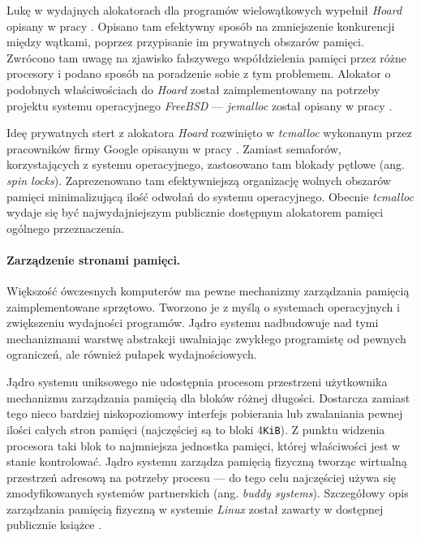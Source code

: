 \documentclass[12pt,a4paper,titlepage,twoside]{mwart}
\begin{document}
Lukę w wydajnych alokatorach dla programów wielowątkowych wypełnił
\textit{Hoard} opisany w pracy \cite{berger00hoard}. Opisano tam efektywny
sposób na zmniejszenie konkurencji między wątkami, poprzez przypisanie im
prywatnych obszarów pamięci. Zwrócono tam uwagę na zjawisko fałszywego
współdzielenia pamięci przez różne procesory i podano sposób na poradzenie
sobie z tym problemem. Alokator o podobnych właściwościach do \textit{Hoard}
został zaimplementowany na potrzeby projektu systemu operacyjnego
\textit{FreeBSD} --- \textit{jemalloc} został opisany w pracy
\cite{evans06scalable}.

Ideę prywatnych stert z alokatora \textit{Hoard} rozwinięto w
\textit{tcmalloc} wykonanym przez pracowników firmy Google opisanym w pracy
\cite{ghemawat07tcmalloc}. Zamiast semaforów, korzystających z systemu
operacyjnego, zastosowano tam blokady pętlowe (ang.  \textit{spin locks}).
Zaprezenowano tam efektywniejszą organizację wolnych obszarów pamięci
minimalizującą ilość odwołań do systemu operacyjnego.  Obecnie
\textit{tcmalloc} wydaje się być najwydajniejszym publicznie dostępnym
alokatorem pamięci ogólnego przeznaczenia.

\paragraph{Zarządzenie stronami pamięci.}

Większość ówczesnych komputerów ma pewne mechanizmy zarządzania pamięcią
zaimplementowane sprzętowo. Tworzono je z myślą o systemach operacyjnych i
zwiększeniu wydajności programów. Jądro systemu nadbudowuje nad tymi
mechanizmami warstwę abstrakcji uwalniając zwykłego programistę od pewnych
ograniczeń, ale również pułapek wydajnościowych.

Jądro systemu uniksowego nie udostępnia procesom przestrzeni użytkownika
mechanizmu zarządzania pamięcią dla bloków różnej długości. Dostarcza zamiast
tego nieco bardziej niskopoziomowy interfejs pobierania lub zwalaniania pewnej
ilości całych stron pamięci (najczęściej są to bloki 4\verb+KiB+). Z punktu
widzenia procesora taki blok to najmniejsza jednostka pamięci, której
właściwości jest w stanie kontrolować. Jądro systemu zarządza pamięcią fizyczną
tworząc wirtualną przestrzeń adresową na potrzeby procesu --- do tego celu
najczęściej używa się zmodyfikowanych systemów partnerskich (ang. \textit{buddy
systems}). Szczegółowy opis zarządzania pamięcią fizyczną w systemie
\textit{Linux} został zawarty w dostępnej publicznie książce
\cite{gorman04linuxvm}.
\end{document}
